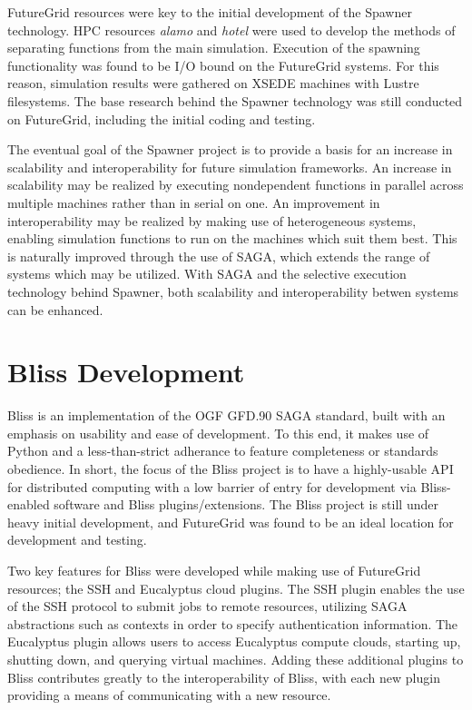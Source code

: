 \documentclass[]{paper}
\begin{document}
FutureGrid resources were key to the initial development of the Spawner technology.
HPC resources \textit{alamo} and \textit{hotel} were used to develop the methods of separating functions
from the main simulation.  Execution of the spawning functionality was found to be I/O
bound on the FutureGrid systems.  For this reason, simulation results were gathered
on XSEDE machines with Lustre filesystems.  The base research behind the Spawner technology
was still conducted on FutureGrid, including the initial coding and testing.

The eventual goal of the Spawner project is to provide a basis for an increase in
scalability and interoperability for future simulation frameworks.  An increase in scalability
may be realized by executing nondependent functions in parallel across multiple machines rather
than in serial on one.  An improvement in interoperability may be realized by making use of heterogeneous systems,
enabling simulation functions to run on the machines which suit them best.  This is naturally improved through
the use of SAGA, which extends the range of systems which may be utilized.  With SAGA and the
selective execution technology behind Spawner, both scalability and interoperability betwen systems
can be enhanced.

\section{Bliss Development}
Bliss is an implementation of the OGF GFD.90 SAGA standard, built with an emphasis
on usability and ease of development.  To this end, it makes use of Python and a
less-than-strict adherance to feature completeness or standards obedience.
In short, the focus of the Bliss project is to have a highly-usable API for distributed
computing with a low barrier of entry for development via Bliss-enabled software
and Bliss plugins/extensions.  The Bliss project is still under heavy 
initial development, and FutureGrid was found to be an ideal location for development and testing.

Two key features for Bliss were developed while making use of FutureGrid resources; 
the SSH and Eucalyptus cloud plugins.  The SSH plugin enables the use of the SSH protocol
to submit jobs to remote resources, utilizing SAGA abstractions such as contexts in order
to specify authentication information.  The Eucalyptus plugin allows users to access
Eucalyptus compute clouds, starting up, shutting down, and querying virtual machines.
Adding these additional plugins to Bliss contributes greatly to the interoperability of
Bliss, with each new plugin providing a means of communicating with a new resource.
\end{document}
